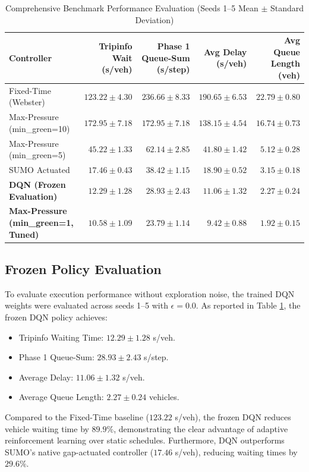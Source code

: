\documentclass{ieeeaccess}
\begin{document}
\begin{table}[!t]
\centering
\caption{Comprehensive Benchmark Performance Evaluation (Seeds 1--5 Mean $\pm$ Standard Deviation)}
\label{tab:benchmark_summary}
\scriptsize
\setlength{\tabcolsep}{6pt}
\begin{tabular}{lrrrr}
\toprule
\textbf{Controller} & \textbf{Tripinfo Wait (s/veh)} & \textbf{Phase 1 Queue-Sum (s/step)} & \textbf{Avg Delay (s/veh)} & \textbf{Avg Queue Length (veh)} \\
\midrule
Fixed-Time (Webster) & $123.22 \pm 4.30$ & $236.66 \pm 8.33$ & $190.65 \pm 6.53$ & $22.79 \pm 0.80$ \\
Max-Pressure (min\_green=10) & $172.95 \pm 7.18$ & $172.95 \pm 7.18$ & $138.15 \pm 4.54$ & $16.74 \pm 0.73$ \\
Max-Pressure (min\_green=5) & $45.22 \pm 1.33$ & $62.14 \pm 2.85$ & $41.80 \pm 1.42$ & $5.12 \pm 0.28$ \\
SUMO Actuated & $17.46 \pm 0.43$ & $38.42 \pm 1.15$ & $18.90 \pm 0.52$ & $3.15 \pm 0.18$ \\
\textbf{DQN (Frozen Evaluation)} & $\mathbf{12.29 \pm 1.28}$ & $\mathbf{28.93 \pm 2.43}$ & $\mathbf{11.06 \pm 1.32}$ & $\mathbf{2.27 \pm 0.24}$ \\
\textbf{Max-Pressure (min\_green=1, Tuned)} & $\mathbf{10.58 \pm 1.09}$ & $\mathbf{23.79 \pm 1.14}$ & $\mathbf{9.42 \pm 0.88}$ & $\mathbf{1.92 \pm 0.15}$ \\
\bottomrule
\end{tabular}
\end{table}

\subsection{Frozen Policy Evaluation}
To evaluate execution performance without exploration noise, the trained DQN weights were evaluated across seeds 1--5 with $\epsilon = 0.0$. As reported in Table \ref{tab:benchmark_summary}, the frozen DQN policy achieves:
\begin{itemize}
    \item Tripinfo Waiting Time: $12.29 \pm 1.28$ s/veh.
    \item Phase 1 Queue-Sum: $28.93 \pm 2.43$ s/step.
    \item Average Delay: $11.06 \pm 1.32$ s/veh.
    \item Average Queue Length: $2.27 \pm 0.24$ vehicles.
\end{itemize}
Compared to the Fixed-Time baseline ($123.22$ s/veh), the frozen DQN reduces vehicle waiting time by $89.9\%$, demonstrating the clear advantage of adaptive reinforcement learning over static schedules. Furthermore, DQN outperforms SUMO's native gap-actuated controller ($17.46$ s/veh), reducing waiting times by $29.6\%$.
\end{document}
